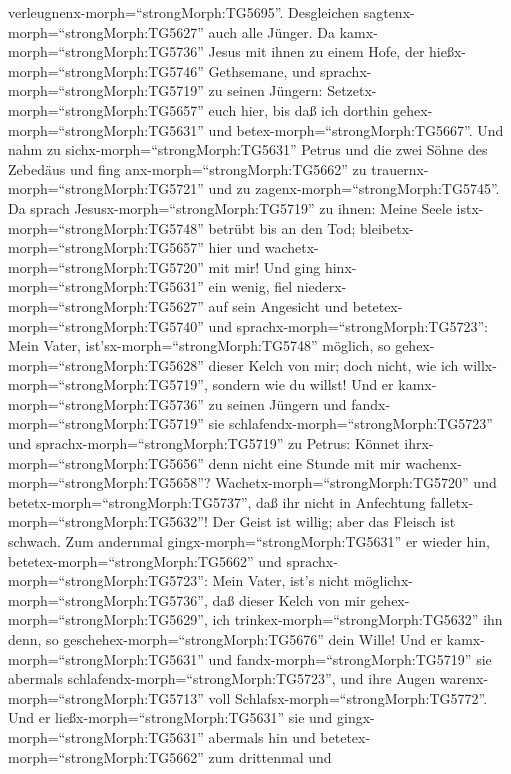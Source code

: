 verleugnenx-morph=``strongMorph:TG5695''. Desgleichen
sagtenx-morph=``strongMorph:TG5627'' auch alle Jünger.  Da
kamx-morph=``strongMorph:TG5736'' Jesus mit ihnen zu einem Hofe, der
hießx-morph=``strongMorph:TG5746'' Gethsemane, und
sprachx-morph=``strongMorph:TG5719'' zu seinen Jüngern:
Setzetx-morph=``strongMorph:TG5657'' euch hier, bis daß ich dorthin
gehex-morph=``strongMorph:TG5631'' und
betex-morph=``strongMorph:TG5667''.  Und nahm zu
sichx-morph=``strongMorph:TG5631'' Petrus und die zwei Söhne des
Zebedäus und fing anx-morph=``strongMorph:TG5662'' zu
trauernx-morph=``strongMorph:TG5721'' und zu
zagenx-morph=``strongMorph:TG5745''.  Da sprach
Jesusx-morph=``strongMorph:TG5719'' zu ihnen: Meine Seele
istx-morph=``strongMorph:TG5748'' betrübt bis an den Tod;
bleibetx-morph=``strongMorph:TG5657'' hier und
wachetx-morph=``strongMorph:TG5720'' mit mir!  Und ging
hinx-morph=``strongMorph:TG5631'' ein wenig, fiel
niederx-morph=``strongMorph:TG5627'' auf sein Angesicht und
betetex-morph=``strongMorph:TG5740'' und
sprachx-morph=``strongMorph:TG5723'': Mein Vater,
ist'sx-morph=``strongMorph:TG5748'' möglich, so
gehex-morph=``strongMorph:TG5628'' dieser Kelch von mir; doch nicht, wie
ich willx-morph=``strongMorph:TG5719'', sondern wie du willst!
 Und er kamx-morph=``strongMorph:TG5736'' zu seinen Jüngern
und fandx-morph=``strongMorph:TG5719'' sie
schlafendx-morph=``strongMorph:TG5723'' und
sprachx-morph=``strongMorph:TG5719'' zu Petrus: Könnet
ihrx-morph=``strongMorph:TG5656'' denn nicht eine Stunde mit mir
wachenx-morph=``strongMorph:TG5658''? 
Wachetx-morph=``strongMorph:TG5720'' und
betetx-morph=``strongMorph:TG5737'', daß ihr nicht in Anfechtung
falletx-morph=``strongMorph:TG5632''! Der Geist ist willig; aber das
Fleisch ist schwach.  Zum andernmal
gingx-morph=``strongMorph:TG5631'' er wieder hin,
betetex-morph=``strongMorph:TG5662'' und
sprachx-morph=``strongMorph:TG5723'': Mein Vater, ist's nicht
möglichx-morph=``strongMorph:TG5736'', daß dieser Kelch von mir
gehex-morph=``strongMorph:TG5629'', ich
trinkex-morph=``strongMorph:TG5632'' ihn denn, so
geschehex-morph=``strongMorph:TG5676'' dein Wille!  Und er
kamx-morph=``strongMorph:TG5631'' und fandx-morph=``strongMorph:TG5719''
sie abermals schlafendx-morph=``strongMorph:TG5723'', und ihre Augen
warenx-morph=``strongMorph:TG5713'' voll
Schlafsx-morph=``strongMorph:TG5772''.  Und er
ließx-morph=``strongMorph:TG5631'' sie und
gingx-morph=``strongMorph:TG5631'' abermals hin und
betetex-morph=``strongMorph:TG5662'' zum drittenmal und
